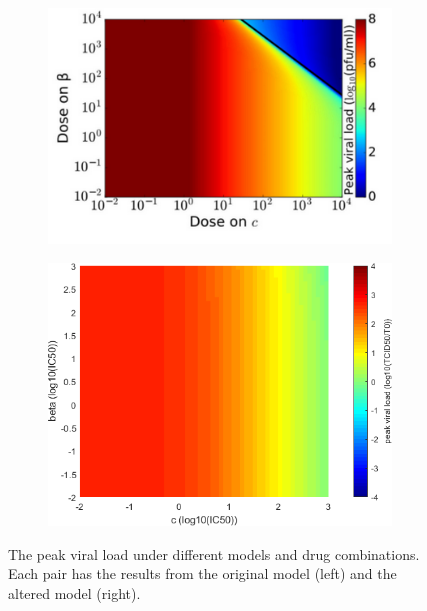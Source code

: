 \documentclass[a4paper,11pt]{article}
\begin{document}
\begin{figure}
\begin{subfigure}{0.4\textwidth}
    \includegraphics[width=\textwidth]{MBetaCP.png}
    \end{subfigure}
    \begin{subfigure}{0.35\textwidth}
    
    \includegraphics[width=\textwidth]{BetaC_peaks.png}
    \end{subfigure}
    \caption{\small The peak viral load under different models and drug combinations. Each pair has the results from the original model (left) and the altered model (right).}
    \label{fig:my_label}
    \end{figure}
  

\newpage
\end{document}
